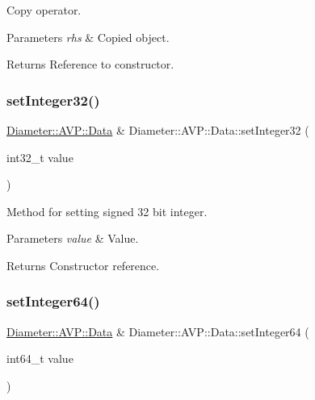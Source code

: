 Copy operator. 


\begin{DoxyParams}{Parameters}
{\em rhs} & Copied object. \\
\hline
\end{DoxyParams}
\begin{DoxyReturn}{Returns}
Reference to constructor. 
\end{DoxyReturn}
\mbox{\label{classDiameter_1_1AVP_1_1Data_ae769d186f3fe50131f726fbc843259ea}} 
\subsubsection{\texorpdfstring{set\+Integer32()}{setInteger32()}}
{\footnotesize\ttfamily \hyperlink{classDiameter_1_1AVP_1_1Data}{Diameter\+::\+A\+V\+P\+::\+Data} \& Diameter\+::\+A\+V\+P\+::\+Data\+::set\+Integer32 (\begin{DoxyParamCaption}\item[{int32\+\_\+t}]{value }\end{DoxyParamCaption})}



Method for setting signed 32 bit integer. 


\begin{DoxyParams}{Parameters}
{\em value} & Value. \\
\hline
\end{DoxyParams}
\begin{DoxyReturn}{Returns}
Constructor reference. 
\end{DoxyReturn}
\mbox{\label{classDiameter_1_1AVP_1_1Data_aa10615ef903cd9806b11fca0bf36a0cf}} 
\subsubsection{\texorpdfstring{set\+Integer64()}{setInteger64()}}
{\footnotesize\ttfamily \hyperlink{classDiameter_1_1AVP_1_1Data}{Diameter\+::\+A\+V\+P\+::\+Data} \& Diameter\+::\+A\+V\+P\+::\+Data\+::set\+Integer64 (\begin{DoxyParamCaption}\item[{int64\+\_\+t}]{value }\end{DoxyParamCaption})}



